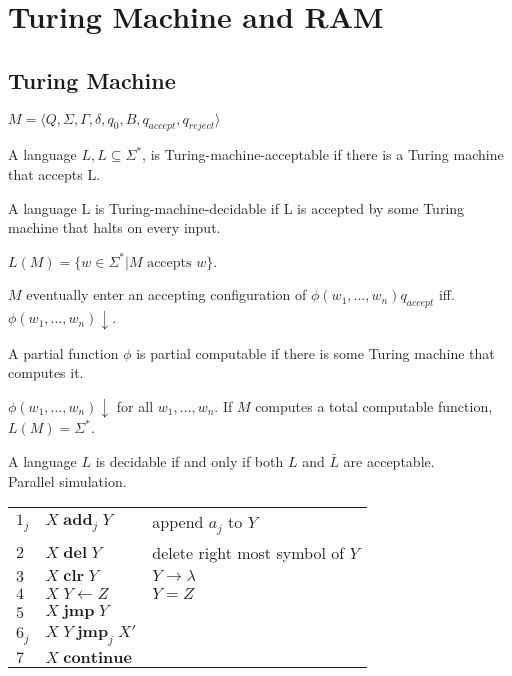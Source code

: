 \section{Turing Machine and RAM}

\subsection{Turing Machine}

 $M=\langle
Q,\Sigma,\Gamma,\delta,q_0,B,q_{accept},q_{reject}\rangle$

 A language $L, L \subseteq \Sigma^*$, is
Turing-machine-acceptable if there is a Turing machine
that accepts L.

 A language L is Turing-machine-decidable if L is accepted by
some
Turing machine that halts on every input.

 $L(M)=\{w \in \Sigma^* | M \text{ accepts } w \}$.

 $M$ eventually enter an accepting configuration of
$\phi(w_1,\ldots,w_n)q_{accept}$ iff.
$\phi(w_1,\ldots,w_n)\downarrow$.

 A partial function $\phi$ is partial computable if there
is some Turing machine
that computes it.

 $\phi(w_1,\ldots,w_n)\downarrow$ for all
$w_1,\ldots,w_n$. If $M$ computes a total computable function, $L(M)=\Sigma^*$.

 A language $L$ is decidable if and only if both $L$ and
$\bar{L}$ are acceptable.\\
Parallel simulation.

\begin{table}[H]
  \begin{tabular}{lll}
    $1_j$ & $X\;\mathbf{add}_j\;Y$ & append $a_j$ to $Y$\\
    $2$ & $X\;\mathbf{del}\;Y$ & delete right most symbol of $Y$\\
    $3$ & $X\;\mathbf{clr}\;Y$ & $Y \rightarrow \lambda$\\
    $4$ & $X\;Y\leftarrow Z$ & $Y=Z$\\
    $5$ & $X\;\mathbf{jmp}\;Y$\\
    $6_j$ & $X\;Y\;\mathbf{jmp}_j\;X'$\\
    $7$ & $X\;\mathbf{continue}$
  \end{tabular}
\end{table}


